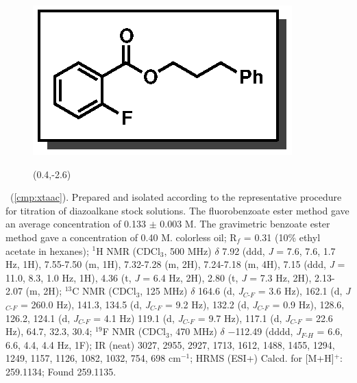 \pagebreak
\begin{figure}
  \vspace{-15pt}
  \begin{center}
    \includegraphics[scale=0.8]{chp_asymmetric/images/xtaac}
          \begin{textblock}{1}(0.4,-2.6)  \end{textblock}
  \end{center}
  \vspace{-35pt}
\end{figure}\noindent \textbf{\CMPxtaac}\ (\ref{cmp:xtaac}). Prepared and
isolated according to the representative procedure for titration of diazoalkane
stock solutions. The fluorobenzoate ester method gave an average concentration
of 0.133 $\pm$ 0.003 M. The gravimetric benzoate ester method gave a
concentration of 0.40 M. colorless oil; R$_f$ = 0.31 (10\% ethyl acetate in
hexanes); $^1$H NMR (CDCl$_3$, 500 MHz) $\delta$ 7.92 (ddd, \textit{J} = 7.6, 7.6, 1.7 Hz, 1H),
7.55-7.50 (m, 1H), 7.32-7.28 (m, 2H), 7.24-7.18 (m, 4H), 7.15 (ddd, \textit{J} =
11.0, 8.3, 1.0 Hz, 1H), 4.36 (t, \textit{J} = 6.4 Hz, 2H), 2.80 (t, \textit{J} =
7.3 Hz, 2H), 2.13-2.07 (m, 2H); $^{13}$C NMR (CDCl$_3$, 125 MHz) $\delta$ 164.6
(d, \textit{J}$_{C\mbox{-}F}$ = 3.6 Hz), 162.1 (d, \textit{J}$_{C\mbox{-}F}$ =
260.0 Hz), 141.3, 134.5 (d, \textit{J}$_{C\mbox{-}F}$ = 9.2 Hz), 132.2 (d,
\textit{J}$_{C\mbox{-}F}$ = 0.9 Hz), 128.6, 126.2, 124.1 (d, \textit{J}$_{C\mbox{-}F}$ = 4.1 Hz) 119.1 (d,
\textit{J}$_{C\mbox{-}F}$ = 9.7 Hz), 117.1 (d, \textit{J}$_{C\mbox{-}F}$ = 22.6
Hz), 64.7, 32.3, 30.4; $^{19}$F NMR (CDCl$_3$, 470 MHz) $\delta$ $-$112.49
(dddd, \textit{J}$_{F\mbox{-}H}$ = 6.6, 6.6, 4.4, 4.4 Hz, 1F); IR (neat) 3027, 2955,
2927, 1713, 1612, 1488, 1455, 1294, 1249, 1157, 1126, 1082, 1032, 754, 698
cm$^{-1}$; HRMS (ESI+) Calcd. for  [M+H]$^+$: 259.1134; Found
259.1135.

